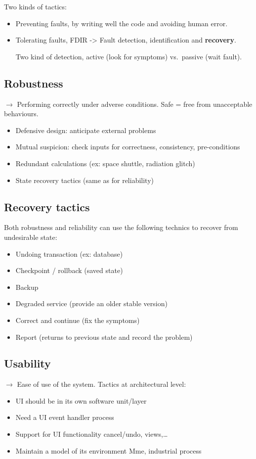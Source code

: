 Two kinds of tactics:

\begin{itemize}
    \item Preventing faults, by writing well the code and avoiding human error.
    \item Tolerating faults, FDIR -> Fault detection, identification and
        \textbf{recovery}. 
        
        Two kind of detection, active (look for symptoms) vs.\ passive (wait fault).
\end{itemize}

\subsection{Robustness}

$\rightarrow$ Performing correctly \textcolor{red!80!black}{under adverse conditions}.
Safe = free from unacceptable behaviours.

\begin{itemize}
    \item Defensive design: anticipate external problems
    \item Mutual suspicion: check inputs for correctness, consistency, pre-conditions
    \item Redundant calculations (ex: space shuttle, radiation glitch)
    \item State recovery tactics (same as for reliability)
\end{itemize}

\subsection{Recovery tactics}

Both robustness and reliability can use the following technics to recover from undesirable
state:

\begin{itemize}
    \item Undoing transaction (ex: database)
    \item Checkpoint / rollback (saved state)
    \item Backup
    \item Degraded service (provide an older stable version)
    \item Correct and continue (fix the symptoms)
    \item Report (returns to previous state and record the problem)
\end{itemize}

\subsection{Usability}
$\rightarrow$ Ease of use of the system.
Tactics at architectural level:
\begin{itemize}
    \item UI should be in its own software unit/layer
    \item Need a UI event handler process
    \item Support for UI functionality cancel/undo, views,\ldots
    \item Maintain a model of its environment Mme, industrial process
\end{itemize}
